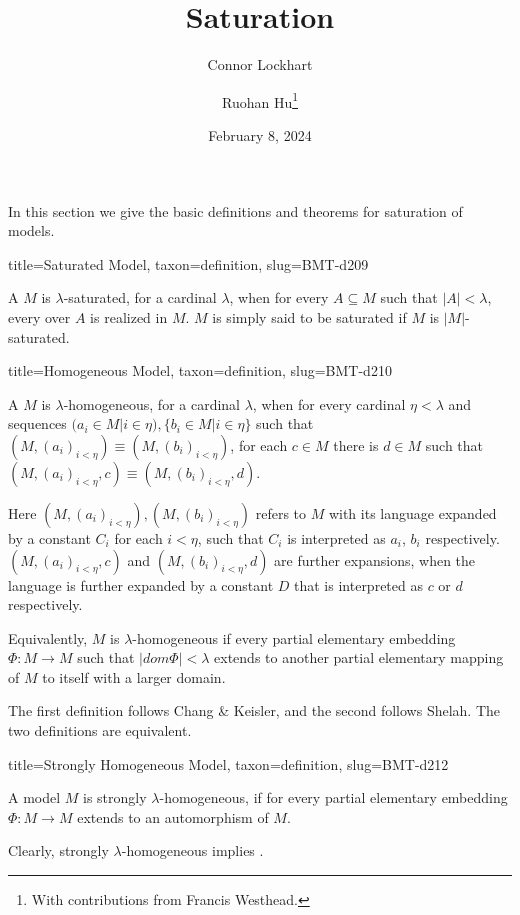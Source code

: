 \documentclass[a4paper]{article}
\title{Saturation}
\date{February 8, 2024}
\author{Connor Lockhart \and Ruohan Hu\thanks{With contributions from Francis Westhead.}}
\begin{document}
\maketitle
\par{In this section we give the basic definitions and theorems for saturation of models.}
\begin{tree}{title={Saturated Model}, taxon={definition}, slug={BMT-d209}}

    A  \(M\) is \(\lambda\)-saturated, for a cardinal \(\lambda\), when for every \(A \subseteq  M\) such that \(|A|< \lambda\), every  over \(A\) is realized in \(M\). \(M\) is simply said to be saturated if \(M\) is \(|M|\)-saturated.

\end{tree}

\begin{tree}{title={Homogeneous Model}, taxon={definition}, slug={BMT-d210}}

    A  \(M\) is \(\lambda\)-homogeneous, for a cardinal \(\lambda\), 
    when for every cardinal \(\eta < \lambda\) and sequences \((a_i \in  M|i \in \eta ), \{ b_i \in  M|i \in \eta \}\) such that \((M,(a_i)_{i< \eta }) \equiv (M,(b_i)_{i< \eta })\), 
    for each \(c \in  M\) there is \(d \in  M\) such that \((M,(a_i)_{i< \eta },c) \equiv (M,(b_i)_{i< \eta },d)\). 

    Here \((M,(a_i)_{i< \eta }),(M,(b_i)_{i< \eta })\) refers to \(M\) with its language expanded by a constant \(C_i\) for each \(i< \eta\), such that \(C_i\) is interpreted as \(a_i\), \(b_i\) respectively. 
    \((M,(a_i)_{i< \eta },c)\) and \((M,(b_i)_{i< \eta },d)\) are further expansions, when the language is further expanded by a constant \(D\) that is interpreted as \(c\) or \(d\) respectively.

    Equivalently, \(M\) is \(\lambda\)-homogeneous if every partial elementary embedding \(\Phi :M \to  M\) such that \(|dom \Phi |< \lambda\) extends to another partial elementary mapping of \(M\) to itself with a larger domain.

    The first definition follows Chang & Keisler, and the second follows Shelah. The two definitions are equivalent.

\end{tree}

\begin{tree}{title={Strongly Homogeneous Model}, taxon={definition}, slug={BMT-d212}}

    A model \(M\) is strongly \(\lambda\)-homogeneous, if for every partial elementary embedding \(\Phi :M \to  M\) extends to an automorphism of \(M\). 

    Clearly, strongly \(\lambda\)-homogeneous implies . 

\end{tree}
\end{document}
